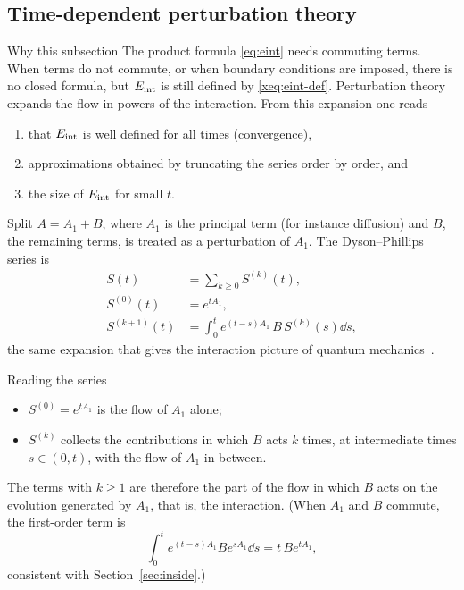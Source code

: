 \subsection{Time-dependent perturbation theory}
\begin{aside}{Why this subsection}
The product formula \eqref{eq:eint} needs commuting terms. When terms do not commute, or when boundary conditions are imposed, there is no closed formula, but $E_{\mathrm{int}}$ is still defined by \eqref{xeq:eint-def}. Perturbation theory expands the flow in powers of the interaction. From this expansion one reads
\begin{enumerate}[nosep,label=(\roman*)]
\item that $E_{\mathrm{int}}$ is well defined for all times (convergence),
\item approximations obtained by truncating the series order by order, and
\item the size of $E_{\mathrm{int}}$ for small $t$.
\end{enumerate}
\end{aside}

Split $A=A_1+B$, where $A_1$ is the principal term (for instance diffusion) and $B$, the remaining terms, is treated as a perturbation of $A_1$. The Dyson--Phillips series is
\begin{equation}\label{eq:dyson}
\begin{aligned}
S(t)&=\sum_{k\ge0}S^{(k)}(t),\\
S^{(0)}(t)&=e^{tA_1},\\
S^{(k+1)}(t)&=\int_0^te^{(t-s)A_1}\,B\,S^{(k)}(s)\dd s ,
\end{aligned}
\end{equation}
the same expansion that gives the interaction picture of quantum mechanics~\cite{dy}.

\begin{aside}{Reading the series}
\begin{itemize}[nosep]
\item $S^{(0)}=e^{tA_1}$ is the flow of $A_1$ alone;
\item $S^{(k)}$ collects the contributions in which $B$ acts $k$ times, at intermediate times $s\in(0,t)$, with the flow of $A_1$ in between.
\end{itemize}
The terms with $k\ge1$ are therefore the part of the flow in which $B$ acts on the evolution generated by $A_1$, that is, the interaction. (When $A_1$ and $B$ commute, the first-order term is
\[
\int_0^te^{(t-s)A_1}Be^{sA_1}\dd s=t\,Be^{tA_1},
\]
consistent with Section~\ref{sec:inside}.)
\end{aside}

